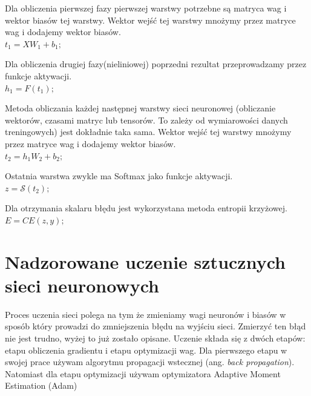 \documentclass{article}
\begin{document}
\begin{flushleft}
Dla obliczenia pierwszej fazy pierwszej warstwy potrzebne są matryca wag i wektor biasów tej warstwy. Wektor wejść tej warstwy mnożymy przez matryce wag i dodajemy wektor biasów.\\
$t_1 = XW_1 + b_1;$\\
\vspace{0.5cm}

Dla obliczenia drugiej fazy(nieliniowej) poprzedni rezultat przeprowadzamy przez funkcje aktywacji.\\
$h_1 = F(t_1);$\\
\vspace{0.5cm}

Metoda obliczania każdej następnej warstwy sieci neuronowej (obliczanie wektorów, czasami matryc lub tensorów. To zależy od wymiarowości danych treningowych) jest dokładnie taka sama. Wektor wejść tej warstwy mnożymy przez matryce wag i dodajemy wektor biasów.\\
$t_2 = h_1W_2 + b_2;$\\
\vspace{0.5cm}

Ostatnia warstwa zwykle ma Softmax jako funkcje aktywacji.\\
$z = \mathcal{S}(t_2);$\\
\vspace{0.5cm}

Dla otrzymania skalaru błędu jest wykorzystana metoda entropii krzyżowej.\\
$E = CE(z,y);$

\end{flushleft}


\section{Nadzorowane uczenie sztucznych sieci neuronowych}
Proces uczenia sieci polega na tym że zmieniamy wagi neuronów i biasów w sposób który prowadzi do zmniejszenia błędu na wyjściu sieci. Zmierzyć ten błąd nie jest trudno, wyżej to już zostało opisane. Uczenie składa się z dwóch etapów: etapu obliczenia gradientu i etapu optymizacji wag. 
Dla pierwszego etapu w swojej prace używam algorytmu propagacji wstecznej (ang. \textit{back propagation}). Natomiast dla etapu optymizacji używam optymizatora Adaptive Moment Estimation (Adam)

\end{document}
